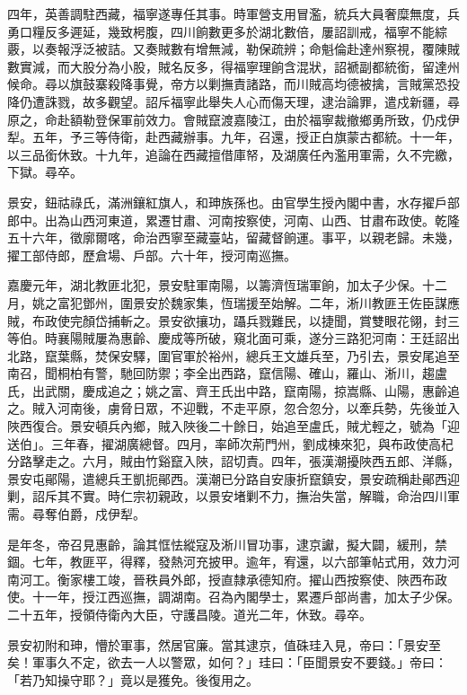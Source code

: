\begin{pinyinscope}
四年，英善調駐西藏，福寧遂專任其事。時軍營支用冒濫，統兵大員奢糜無度，兵勇口糧反多遲延，幾致枵腹，四川餉數更多於湖北數倍，屢詔訓戒，福寧不能綜覈，以奏報浮泛被詰。又奏賊數有增無減，勒保疏辨；命魁倫赴達州察視，覆陳賊數實減，而大股分為小股，賊名反多，得福寧理餉含混狀，詔褫副都統銜，留達州候命。尋以旗鼓寨殺降事覺，帝方以剿撫責諸路，而川賊高均德被擒，言賊黨恐投降仍遭誅戮，故多觀望。詔斥福寧此舉失人心而傷天理，逮治論罪，遣戍新疆，尋原之，命赴額勒登保軍前效力。會賊竄渡嘉陵江，由於福寧裁撤鄉勇所致，仍戍伊犁。五年，予三等侍衛，赴西藏辦事。九年，召還，授正白旗蒙古都統。十一年，以三品銜休致。十九年，追論在西藏擅借庫帑，及湖廣任內濫用軍需，久不完繳，下獄。尋卒。

景安，鈕祜祿氏，滿洲鑲紅旗人，和珅族孫也。由官學生授內閣中書，水存擢戶部郎中。出為山西河東道，累遷甘肅、河南按察使，河南、山西、甘肅布政使。乾隆五十六年，徵廓爾喀，命治西寧至藏臺站，留藏督餉運。事平，以親老歸。未幾，擢工部侍郎，歷倉場、戶部。六十年，授河南巡撫。

嘉慶元年，湖北教匪北犯，景安駐軍南陽，以籌濟恆瑞軍餉，加太子少保。十二月，姚之富犯鄧州，圍景安於魏家集，恆瑞援至始解。二年，淅川教匪王佐臣謀應賊，布政使完顏岱捕斬之。景安欲攘功，躡兵戮難民，以捷聞，賞雙眼花翎，封三等伯。時襄陽賊屢為惠齡、慶成等所破，窺北面可乘，遂分三路犯河南：王廷詔出北路，竄葉縣，焚保安驛，圍官軍於裕州，總兵王文雄兵至，乃引去，景安尾追至南召，聞桐柏有警，馳回防禦；李全出西路，竄信陽、確山，羅山、淅川，趨盧氏，出武關，慶成追之；姚之富、齊王氏出中路，竄南陽，掠嵩縣、山陽，惠齡追之。賊入河南後，虜脅日眾，不迎戰，不走平原，忽合忽分，以牽兵勢，先後並入陜西復合。景安頓兵內鄉，賊入陜後二十餘日，始追至盧氏，賊尤輕之，號為「迎送伯」。三年春，擢湖廣總督。四月，率師次荊門州，劉成棟來犯，與布政使高杞分路擊走之。六月，賊由竹谿竄入陜，詔切責。四年，張漢潮擾陜西五郎、洋縣，景安屯鄖陽，遣總兵王凱扼鄖西。漢潮已分路自安康折竄鎮安，景安疏稱赴鄖西迎剿，詔斥其不實。時仁宗初親政，以景安堵剿不力，撫治失當，解職，命治四川軍需。尋奪伯爵，戍伊犁。

是年冬，帝召見惠齡，論其恇怯縱寇及淅川冒功事，逮京讞，擬大闢，緩刑，禁錮。七年，教匪平，得釋，發熱河充披甲。逾年，宥還，以六部筆帖式用，效力河南河工。衡家樓工竣，晉秩員外郎，授直隸承德知府。擢山西按察使、陜西布政使。十一年，授江西巡撫，調湖南。召為內閣學士，累遷戶部尚書，加太子少保。二十五年，授領侍衛內大臣，守護昌陵。道光二年，休致。尋卒。

景安初附和珅，懵於軍事，然居官廉。當其逮京，值硃珪入見，帝曰：「景安至矣！軍事久不定，欲去一人以警眾，如何？」珪曰：「臣聞景安不要錢。」帝曰：「若乃知操守耶？」竟以是獲免。後復用之。


\end{pinyinscope}

